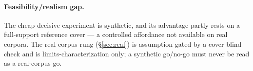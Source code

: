\paragraph{Feasibility/realism gap.} The cheap decisive experiment is synthetic,
and its advantage partly rests on a full-support reference cover --- a controlled
affordance not available on real corpora. The real-corpus rung
(\S\ref{sec:real}) is assumption-gated by a cover-blind check and is
limits-characterization only; a synthetic go/no-go must never be read as a
real-corpus go.
